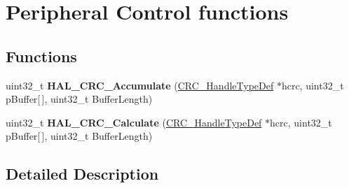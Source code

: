 \hypertarget{group___c_r_c___exported___functions___group2}{}\section{Peripheral Control functions}
\label{group___c_r_c___exported___functions___group2}
\subsection*{Functions}
\begin{DoxyCompactItemize}
\item 
uint32\+\_\+t {\bfseries H\+A\+L\+\_\+\+C\+R\+C\+\_\+\+Accumulate} (\hyperlink{struct_c_r_c___handle_type_def}{C\+R\+C\+\_\+\+Handle\+Type\+Def} $\ast$hcrc, uint32\+\_\+t p\+Buffer\mbox{[}$\,$\mbox{]}, uint32\+\_\+t Buffer\+Length)\hypertarget{group___c_r_c___exported___functions___group2_ga124a77d595e4982ad6e9a64c22f28b7b}{}\label{group___c_r_c___exported___functions___group2_ga124a77d595e4982ad6e9a64c22f28b7b}

\item 
uint32\+\_\+t {\bfseries H\+A\+L\+\_\+\+C\+R\+C\+\_\+\+Calculate} (\hyperlink{struct_c_r_c___handle_type_def}{C\+R\+C\+\_\+\+Handle\+Type\+Def} $\ast$hcrc, uint32\+\_\+t p\+Buffer\mbox{[}$\,$\mbox{]}, uint32\+\_\+t Buffer\+Length)\hypertarget{group___c_r_c___exported___functions___group2_ga298593a6fb0bbd109cdbed3851806371}{}\label{group___c_r_c___exported___functions___group2_ga298593a6fb0bbd109cdbed3851806371}

\end{DoxyCompactItemize}


\subsection{Detailed Description}
